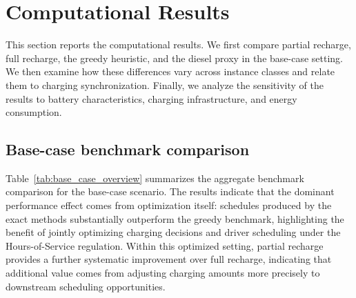 \documentclass[3p,11pt,authoryear]{elsarticle}  %
\begin{document}












\section{Computational Results} \label{sec:Computational Results}

This section reports the computational results. We first compare partial recharge, full recharge, the greedy heuristic, and the diesel proxy in the base-case setting. We then examine how these differences vary across instance classes and relate them to charging synchronization. Finally, we analyze the sensitivity of the results to battery characteristics, charging infrastructure, and energy consumption.

\subsection{Base-case benchmark comparison}

Table~\ref{tab:base_case_overview} summarizes the aggregate benchmark comparison for the base-case scenario. The results indicate that the dominant performance effect comes from optimization itself: schedules produced by the exact methods substantially outperform the greedy benchmark, highlighting the benefit of jointly optimizing charging decisions and driver scheduling under the Hours-of-Service regulation. Within this optimized setting, partial recharge provides a further systematic improvement over full recharge, indicating that additional value comes from adjusting charging amounts more precisely to downstream scheduling opportunities.
\end{document}
